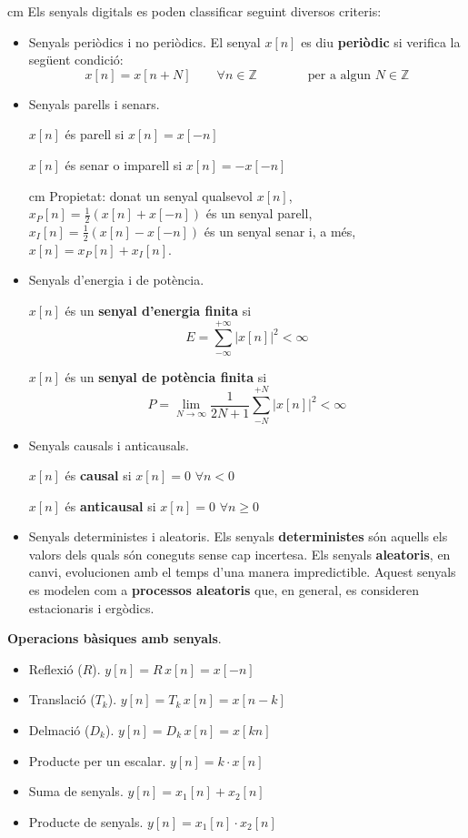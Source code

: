 \documentclass{article}
\newcommand\Z{\mathbb{Z}}
\begin{document}
 cm
\noindent
Els senyals digitals es poden classificar seguint diversos
criteris:
\begin{itemize}
\item Senyals peri\`odics i no peri\`odics. El senyal $x[n]$ es diu \textbf{peri\`odic}
si verifica la seg\"uent condici\'o:
\[
x[n]=x[n+N] \qquad \forall n \in \Z \qquad \qquad \text{per a algun $N \in \Z$} 
\]
\item Senyals parells i senars.

\noindent
$x[n]$ \'es parell si $x[n]=x[-n]$

\noindent
$x[n]$ \'es senar o imparell si $x[n]=-x[-n]$

 cm
\noindent
Propietat: donat un senyal qualsevol $x[n]$, $x_P[n]=\frac{1}{2} (x[n]+x[-n])$ \'es
un senyal parell, $x_I[n]=\frac{1}{2} (x[n]-x[-n])$ \'es un senyal senar i, a m\'es,
$x[n]=x_P[n]+x_I[n]$.

\item Senyals d'energia i de pot\`encia.

\noindent
$x[n]$ \'es un \textbf{senyal d'energia finita} si 
\[
E=\sum_{-\infty}^{+\infty} |x[n]|^2 < \infty
\]

\noindent
$x[n]$ \'es un \textbf{senyal de pot\`encia finita} si 
\[
P=\lim_{N \rightarrow \infty} \frac{1}{2N+1} \sum_{-N}^{+N} |x[n]|^2 < \infty
\]

\item Senyals causals i anticausals.

\noindent
$x[n]$ \'es \textbf{causal} si $x[n]=0$ $\forall n < 0$

\noindent
$x[n]$ \'es \textbf{anticausal} si $x[n]=0$ $\forall n \geq 0$


\item Senyals deterministes i aleatoris. Els senyals \textbf{deterministes} s\'on aquells
els valors dels quals s\'on coneguts sense cap incertesa. 
Els senyals \textbf{aleatoris}, en canvi, evolucionen amb el temps d'una manera
impredictible. Aquest senyals es modelen com a \textbf{processos aleatoris}
que, en general, es consideren estacionaris i erg\`odics.
\end{itemize}


\newpage
\noindent
\textbf{Operacions b\`asiques amb senyals}.
\begin{itemize}
\item Reflexi\'o ($R$). $y[n]=R \, x[n] = x[-n]$ 

\item Translaci\'o ($T_k$). $y[n]=T_k \, x[n] = x[n-k]$

\item Delmaci\'o ($D_k$). $y[n]=D_k \, x[n]=x[k n]$

\item Producte per un escalar. $y[n]=k \cdot x[n]$

\item Suma de senyals. $y[n]=x_1[n] + x_2[n]$

\item Producte de senyals. $y[n]=x_1[n] \cdot x_2[n]$
 
\end{itemize}
\end{document}

